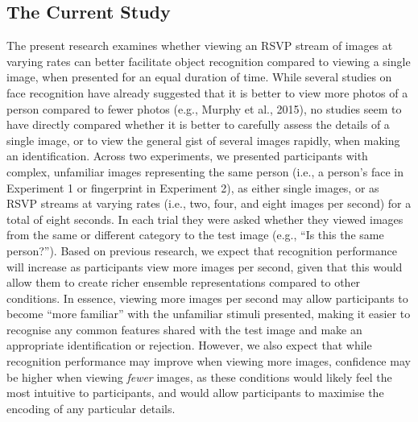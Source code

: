 \documentclass[
  english,
  man]{apa6}
\begin{document}
\hypertarget{the-current-study}{%
\subsection{The Current Study}\label{the-current-study}}

The present research examines whether viewing an RSVP stream of images at varying rates can better facilitate object recognition compared to viewing a single image, when presented for an equal duration of time. While several studies on face recognition have already suggested that it is better to view more photos of a person compared to fewer photos (e.g., Murphy et al., 2015), no studies seem to have directly compared whether it is better to carefully assess the details of a single image, or to view the general gist of several images rapidly, when making an identification. Across two experiments, we presented participants with complex, unfamiliar images representing the same person (i.e., a person's face in Experiment 1 or fingerprint in Experiment 2), as either single images, or as RSVP streams at varying rates (i.e., two, four, and eight images per second) for a total of eight seconds. In each trial they were asked whether they viewed images from the same or different category to the test image (e.g., ``Is this the same person?''). Based on previous research, we expect that recognition performance will increase as participants view more images per second, given that this would allow them to create richer ensemble representations compared to other conditions. In essence, viewing more images per second may allow participants to become ``more familiar'' with the unfamiliar stimuli presented, making it easier to recognise any common features shared with the test image and make an appropriate identification or rejection. However, we also expect that while recognition performance may improve when viewing more images, confidence may be higher when viewing \emph{fewer} images, as these conditions would likely feel the most intuitive to participants, and would allow participants to maximise the encoding of any particular details.
\end{document}
